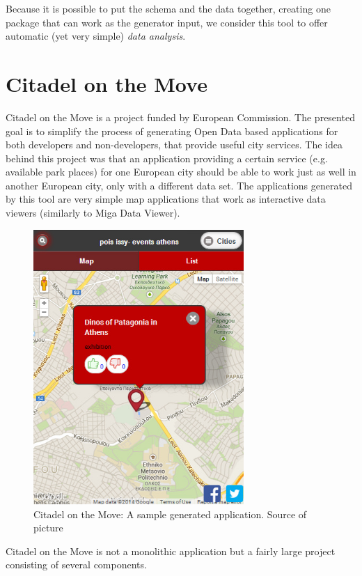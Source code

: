 Because it is possible to put the schema and the data together, creating one package that can work as the generator input, we consider this tool to offer automatic (yet very simple) \emph{data analysis}.

\section{Citadel on the Move}

Citadel on the Move \cite{citadel_home} is a project \cite{citadel_paper} funded by European Commission. The presented goal is to simplify the process of generating Open Data based applications for both developers and non-developers, that provide useful city services. The idea behind this project was that an application providing a certain service (e.g. available park places) for one European city should be able to work just as well in another European city, only with a different data set. The applications generated by this tool are very simple map applications that work as interactive data viewers (similarly to Miga Data Viewer).

\begin{figure}
	\centering
	\includegraphics[width=80mm]{img/02_citadel_on_the_move_app.jpg}
	\caption{Citadel on the Move: A sample generated application. Source of picture \cite{citadel_agt_doc}}
	\label{fig:citadel-on-the-move}
\end{figure}

Citadel on the Move is not a monolithic application but a fairly large project consisting of several components.

